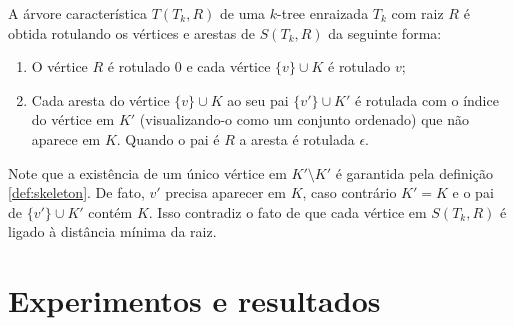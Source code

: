 \begin{definition}
  \cite{caminiti} A árvore característica $T(T_k, R)$ de uma $k$-tree enraizada $T_k$ com raiz $R$ é obtida rotulando os vértices e arestas de $S(T_k, R)$ da seguinte forma:

  \begin{enumerate}
    \item O vértice $R$ é rotulado $0$ e cada vértice $\{v\} \cup K$ é rotulado $v$;
    \item Cada aresta do vértice $\{v\} \cup K$ ao seu pai $\{v'\} \cup K'$ é rotulada com o índice do vértice em $K'$ (visualizando-o como um conjunto ordenado) que não aparece em $K$. Quando o pai é $R$ a aresta é rotulada $\epsilon$.
  \end{enumerate}

  Note que a existência de um único vértice em $K' \setminus K'$ é garantida pela definição \ref{def:skeleton}. De fato, $v'$ precisa aparecer em $K$, caso contrário $K' = K$ e o pai de $\{v'\} \cup K'$ contém $K$. Isso contradiz o fato de que cada vértice em $S(T_k, R)$ é ligado à distância mínima da raiz.
\end{definition}

\section{Experimentos e resultados}



